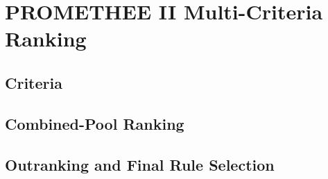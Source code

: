 \documentclass[../main.tex]{subfiles}
\begin{document}
\section{PROMETHEE II Multi-Criteria Ranking}
\label{sec:method-promethee}


\subsection{Criteria}
\label{sec:promethee-criteria}

\subsection{Combined-Pool Ranking}
\label{sec:promethee-combined-pool}

\subsection{Outranking and Final Rule Selection}
\label{sec:promethee-selection}
\end{document}
